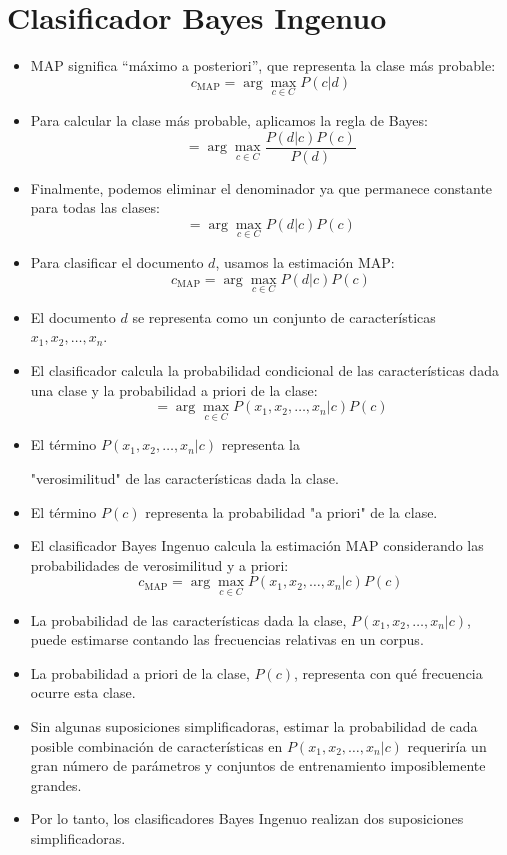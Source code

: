 \section{Clasificador Bayes Ingenuo}
\begin{itemize}
    \item MAP significa ``máximo a posteriori'', que representa la clase más probable:
    \[
    c_{\text{MAP}} = \arg\max_{c \in C} P(c | d)
    \]
    \item Para calcular la clase más probable, aplicamos la regla de Bayes:
    \[
    = \arg\max_{c \in C} \frac{P(d | c)P(c)}{P(d)}
    \]
    \item Finalmente, podemos eliminar el denominador ya que permanece constante para todas las clases:
    \[
    = \arg\max_{c \in C} P(d | c)P(c)
    \]
    \item Para clasificar el documento $d$, usamos la estimación MAP:
    \[
    c_{\text{MAP}} = \arg\max_{c \in C} P(d | c)P(c)
    \]
    \item El documento $d$ se representa como un conjunto de características $x_1, x_2, \ldots, x_n$.
    \item El clasificador calcula la probabilidad condicional de las características dada una clase y la probabilidad a priori de la clase:
    \[
    = \arg\max_{c \in C} P(x_1, x_2, \ldots, x_n | c)P(c)
    \]
    \item El término $P(x_1, x_2, \ldots, x_n | c)$ representa la

 "verosimilitud" de las características dada la clase.
    \item El término $P(c)$ representa la probabilidad "a priori" de la clase.
    \item El clasificador Bayes Ingenuo \cite{mccallum1998comparison} calcula la estimación MAP considerando las probabilidades de verosimilitud y a priori:
    \[
    c_{\text{MAP}} = \arg\max_{c \in C} P(x_1, x_2, \ldots, x_n | c)P(c)
    \]
    \item La probabilidad de las características dada la clase, $P(x_1, x_2, \ldots, x_n | c)$, puede estimarse contando las frecuencias relativas en un corpus.
    \item La probabilidad a priori de la clase, $P(c)$, representa con qué frecuencia ocurre esta clase.
    \item Sin algunas suposiciones simplificadoras, estimar la probabilidad de cada posible combinación de características en $P(x_1, x_2, \ldots, x_n | c)$ requeriría un gran número de parámetros y conjuntos de entrenamiento imposiblemente grandes.
    \item Por lo tanto, los clasificadores Bayes Ingenuo realizan dos suposiciones simplificadoras.
\end{itemize}


